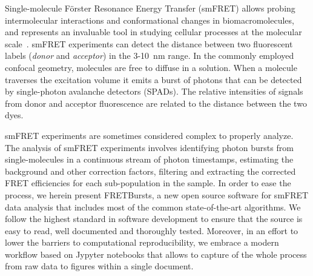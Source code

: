Single-molecule Förster Resonance Energy Transfer (smFRET) allows probing intermolecular interactions
and conformational changes in biomacromolecules, and represents an 
invaluable tool in studying cellular processes at the molecular 
scale~\cite{Kapanidis_2006}. smFRET experiments can detect the distance between 
two fluorescent labels (\textit{donor} and \textit{acceptor}) in the 
3-10~nm range. In the commonly employed confocal geometry, molecules are free 
to diffuse in a solution. When a molecule traverses the excitation volume it 
emits a burst of photons that can be detected by single-photon avalanche detectors (SPADs). 
The relative intensities of signals from donor and acceptor fluorescence 
are related to the distance between the two dyes.

smFRET experiments are sometimes considered complex to properly analyze. 
The analysis of smFRET experiments involves identifying photon bursts from 
single-molecules in a continuous stream of photon timestamps, estimating the 
background and other correction factors, filtering and extracting the corrected 
FRET efficiencies for each sub-population in the sample. In order to ease 
the process, we herein present FRETBursts, a new open source software for smFRET data 
analysis that includes most of the common state-of-the-art algorithms. 
We follow the highest standard in software development to ensure that 
the source is easy to read, well documented and thoroughly tested. 
Moreover, in an effort to lower the barriers to computational reproducibility, 
we embrace a modern workflow based on Jypyter notebooks that allows to capture 
of the whole process from raw data to figures within a single document.
